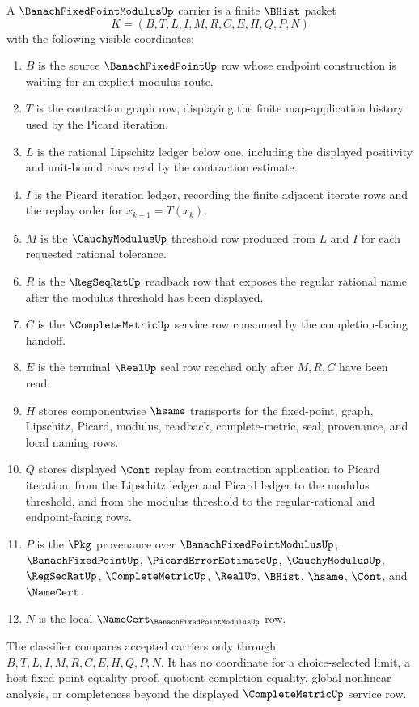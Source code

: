 \begin{definition}
\label{def:banach-fixed-point-modulus-carrier}
A $\BanachFixedPointModulusUp$ carrier is a finite $\BHist$ packet
$$
K=(B,T,L,I,M,R,C,E,H,Q,P,N)
$$
with the following visible coordinates:
\begin{enumerate}
\item $B$ is the source $\BanachFixedPointUp$ row whose endpoint construction is waiting for an explicit modulus route.
\item $T$ is the contraction graph row, displaying the finite map-application history used by the Picard iteration.
\item $L$ is the rational Lipschitz ledger below one, including the displayed positivity and unit-bound rows read by the contraction estimate.
\item $I$ is the Picard iteration ledger, recording the finite adjacent iterate rows and the replay order for $x_{k+1}=T(x_k)$.
\item $M$ is the $\CauchyModulusUp$ threshold row produced from $L$ and $I$ for each requested rational tolerance.
\item $R$ is the $\RegSeqRatUp$ readback row that exposes the regular rational name after the modulus threshold has been displayed.
\item $C$ is the $\CompleteMetricUp$ service row consumed by the completion-facing handoff.
\item $E$ is the terminal $\RealUp$ seal row reached only after $M,R,C$ have been read.
\item $H$ stores componentwise $\hsame$ transports for the fixed-point, graph, Lipschitz, Picard, modulus, readback, complete-metric, seal, provenance, and local naming rows.
\item $Q$ stores displayed $\Cont$ replay from contraction application to Picard iteration, from the Lipschitz ledger and Picard ledger to the modulus threshold, and from the modulus threshold to the regular-rational and endpoint-facing rows.
\item $P$ is the $\Pkg$ provenance over $\BanachFixedPointModulusUp$, $\BanachFixedPointUp$, $\PicardErrorEstimateUp$, $\CauchyModulusUp$, $\RegSeqRatUp$, $\CompleteMetricUp$, $\RealUp$, $\BHist$, $\hsame$, $\Cont$, and $\NameCert$.
\item $N$ is the local $\NameCert_{\BanachFixedPointModulusUp}$ row.
\end{enumerate}
The classifier compares accepted carriers only through $B,T,L,I,M,R,C,E,H,Q,P,N$. It has no coordinate for a choice-selected limit, a host fixed-point equality proof, quotient completion equality, global nonlinear analysis, or completeness beyond the displayed $\CompleteMetricUp$ service row.
\end{definition}

